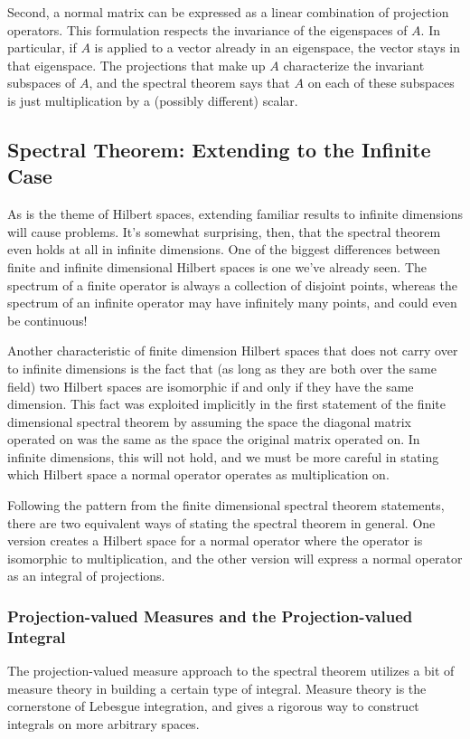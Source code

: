 Second, a normal matrix can be expressed as a linear combination of projection
operators. This formulation respects the invariance of the eigenspaces of $A$.
In particular, if $A$ is applied to a vector already in an eigenspace, the
vector stays in that eigenspace. The projections that make up $A$ characterize
the invariant subspaces of $A$, and the spectral theorem says that $A$ on each
of these subspaces is just multiplication by a (possibly different) scalar.

\subsection{Spectral Theorem: Extending to the Infinite Case}

As is the theme of Hilbert spaces, extending familiar results to infinite
dimensions will cause problems. It's somewhat surprising, then, that the
spectral theorem even holds at all in infinite dimensions. One of the biggest
differences between finite and infinite dimensional Hilbert spaces is one we've
already seen. The spectrum of a finite operator is always a collection of
disjoint points, whereas the spectrum of an infinite operator may have
infinitely many points, and could even be continuous!

Another characteristic of finite dimension Hilbert spaces that does not carry
over to infinite dimensions is the fact that (as long as they are both over the
same field) two Hilbert spaces are isomorphic if and only if they have the same
dimension. This fact was exploited implicitly in the first statement of the
finite dimensional spectral theorem by assuming the space the diagonal matrix
operated on was the same as the space the original matrix operated on. In
infinite dimensions, this will not hold, and we must be more careful in stating
which Hilbert space a normal operator operates as multiplication on.

Following the pattern from the finite dimensional spectral theorem statements,
there are two equivalent ways of stating the spectral theorem in general. One
version creates a Hilbert space for a normal operator where the operator is
isomorphic to multiplication, and the other version will express a normal
operator as an integral of projections.

\subsubsection{Projection-valued Measures and the Projection-valued Integral}
The projection-valued measure approach to the spectral theorem utilizes a bit of
measure theory in building a certain type of integral. Measure theory is the
cornerstone of Lebesgue integration, and gives a rigorous way to construct
integrals on more arbitrary spaces.


